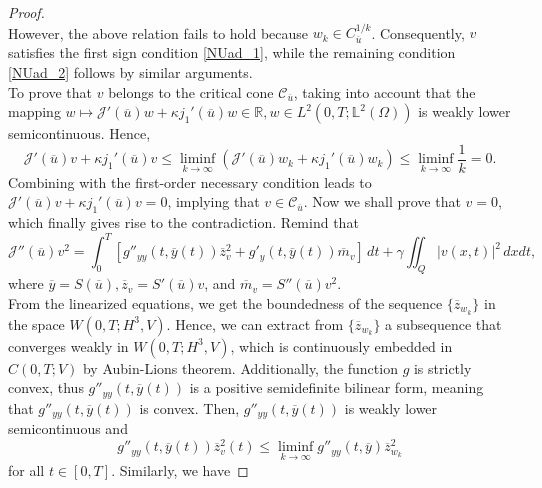 \documentclass[reqno]{amsart}
\begin{document}
\begin{proof}
\begin{equation*}
		\end{equation*}
		However, the above relation fails to hold because $w_k \in C_{\overline{u}}^{1/k}$. Consequently, $v$ satisfies the first sign condition \eqref{NUad_1}, while the remaining condition \eqref{NUad_2} follows by similar arguments. \\
		To prove that $v$ belongs to the critical cone $\mathcal{C}_{\overline{u}}$, taking into account that the mapping $w \mapsto \mathcal{J}'(\overline{u})w + \kappa j_1'(\overline{u})w\in \mathbb{R}, w\in L^2(0,T;\mathbb{L}^2(\Omega))$ is weakly lower semicontinuous.
		Hence, 
		\begin{equation*}
			\mathcal{J}'(\overline{u})v + \kappa j_1'(\overline{u})v \leq \underset{k\rightarrow \infty}{\liminf} \left( \mathcal{J}'(\overline{u})w_k + \kappa j_1'(\overline{u})w_k \right) \leq \underset{k\rightarrow \infty}{\liminf} \frac{1}{k} = 0.
		\end{equation*}
		Combining with the first-order necessary condition leads to $\mathcal{J}'(\overline{u})v + \kappa j_1'(\overline{u})v =0$, implying that $v \in \mathcal{C}_{\overline{u}}$. Now we shall prove that $v=0$, which finally gives rise to the contradiction.
		Remind that
		\begin{equation*}
			\mathcal{J}''(\overline{u})v^2 = \int_0^T \left[ g''_{yy}(t, \overline{y}(t))\overline{z}^2_v + g'_y(t,\overline{y}(t))\overline{m}_v \right] \,dt + \gamma \iint_Q \vert v(x,t) \vert^2 \, dxdt,
		\end{equation*}
		where $\overline{y}=S(\overline{u}), \overline{z}_v=S'(\overline{u})v$, and $\overline{m}_v=S''(\overline{u})v^2$. \\ From the linearized equations, we get the boundedness of the sequence $\{ \overline{z}_{w_k} \}$ in the space $W(0,T;H^3, V)$. Hence, we can extract from $\{ \overline{z}_{w_k} \}$ a subsequence that converges weakly in $W(0,T;H^3, V)$, which is continuously embedded in $C(0,T;V)$ by Aubin-Lions theorem. Additionally, the function $g$ is strictly convex, thus $g''_{yy}(t, \overline{y}(t))$ is a positive semidefinite bilinear form, meaning that $g''_{yy}(t, \overline{y}(t))$ is convex. Then, $g''_{yy}(t, \overline{y}(t))$ is weakly lower semicontinuous and 
		\begin{equation} \label{5.3.3}
			g''_{yy}(t, \overline{y}(t))\overline{z}_v^2(t) \leq \underset{k\rightarrow \infty}{\liminf} g''_{yy}(t, \overline{y})\overline{z}^2_{w_k}
		\end{equation}
		for all $t \in [0,T]$. Similarly, we have 

\end{proof}
\end{document}
